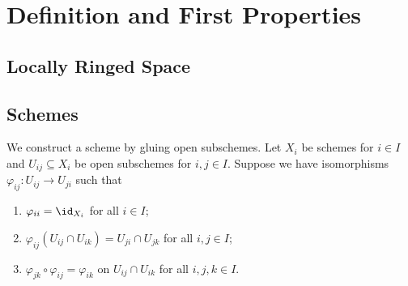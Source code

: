 \section{Definition and First Properties}


\subsection{Locally Ringed Space}


\subsection{Schemes}

    \begin{example}\label{eg:glue_open_subschemes}
        We construct a scheme by gluing open subschemes.
        Let \(X_i\) be schemes for \(i \in I\) and \(U_{ij} \subseteq X_i\) be open subschemes for \(i,j \in I\).
        Suppose we have isomorphisms \(\varphi_{ij} : U_{ij} \to U_{ji}\) such that
        \begin{enumerate}
            \item \(\varphi_{ii} = \id_{X_i}\) for all \(i \in I\);
            \item \(\varphi_{ij}(U_{ij} \cap U_{ik}) = U_{ji} \cap U_{jk}\) for all \(i,j \in I\);
            \item \(\varphi_{jk}\circ \varphi_{ij} = \varphi_{ik}\) on \(U_{ij} \cap U_{ik}\) for all \(i,j,k \in I\).
        \end{enumerate}
        \Yang{}
    \end{example}

